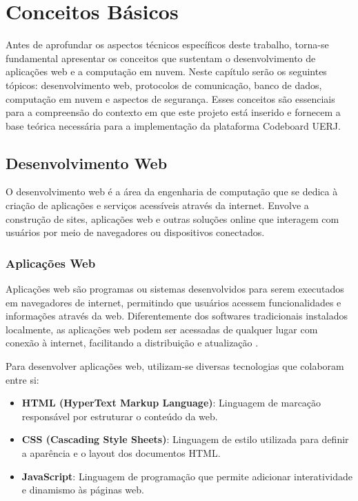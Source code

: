 \chapter{Conceitos Básicos}

Antes de aprofundar os aspectos técnicos específicos deste trabalho, torna-se fundamental apresentar os conceitos que sustentam o desenvolvimento de aplicações web e a computação em nuvem. Neste capítulo serão os seguintes tópicos: desenvolvimento web, protocolos de comunicação, banco de dados, computação em nuvem e aspectos de segurança. Esses conceitos são essenciais para a compreensão do contexto em que este projeto está inserido e fornecem a base teórica necessária para a implementação da plataforma Codeboard UERJ.

\section{Desenvolvimento Web}

O desenvolvimento web é a área da engenharia de computação que se dedica à criação de aplicações e serviços acessíveis através da internet. Envolve a construção de sites, aplicações web e outras soluções online que interagem com usuários por meio de navegadores ou dispositivos conectados.

\subsection{Aplicações Web}


Aplicações web são programas ou sistemas desenvolvidos para serem executados em navegadores de internet, permitindo que usuários acessem funcionalidades e informações através da web. Diferentemente dos softwares tradicionais instalados localmente, as aplicações web podem ser acessadas de qualquer lugar com conexão à internet, facilitando a distribuição e atualização \cite{web-app}.

Para desenvolver aplicações web, utilizam-se diversas tecnologias que colaboram entre si:

\begin{itemize}
    \item \textbf{HTML (HyperText Markup Language)}: Linguagem de marcação responsável por estruturar o conteúdo da web.
    \item \textbf{CSS (Cascading Style Sheets)}: Linguagem de estilo utilizada para definir a aparência e o layout dos documentos HTML.
    \item \textbf{JavaScript}: Linguagem de programação que permite adicionar interatividade e dinamismo às páginas web.
\end{itemize}

